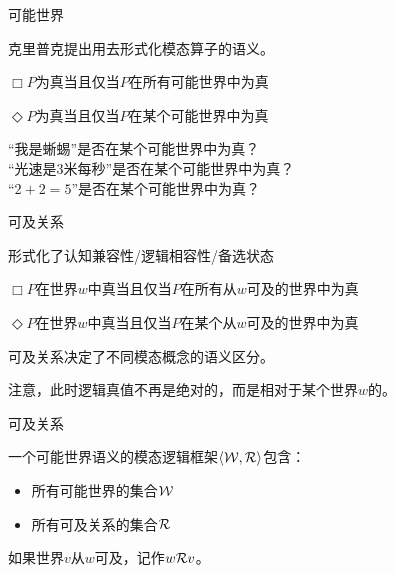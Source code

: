 \documentclass{zhslides}
\begin{document}
\begin{frame}{可能世界}
  
  \bit
    \item 克里普克提出用去形式化模态算子的语义。
    \item $\Box P$为真当且仅当$P$在所有可能世界中为真
    \item $\Diamond P$为真当且仅当$P$在某个可能世界中为真
  \eit
  \vspace{1.5em}
  \pause
  
  \begin{brainstorm*}{}
    “我是蜥蜴”是否在某个可能世界中为真？\\
    “光速是$3$米每秒”是否在某个可能世界中为真？\\
    “$2+2=5$”是否在某个可能世界中为真？
  \end{brainstorm*}
  \vspace{-1em}

\end{frame}


\begin{frame}{可及关系}
  
  形式化了认知兼容性/逻辑相容性/备选状态
  
  \bit
    \item $\Box P$在世界$w$中真当且仅当$P$在所有从$w$可及的世界中为真
    \item $\Diamond P$在世界$w$中真当且仅当$P$在某个从$w$可及的世界中为真
  \eit
  \pause
  
  可及关系决定了不同模态概念的语义区分。
  
  注意，此时逻辑真值不再是绝对的，而是相对于某个世界$w$的。
  
\end{frame}


\begin{frame}{可及关系}
  
  \begin{definition*}{}
    一个可能世界语义的模态逻辑框架$\oset{\struct{W}, \struct{R}}$包含：
    \begin{itemize}
      \item 所有可能世界的集合$\mathcal{W}$
      \item 所有可及关系的集合$\mathcal{R}$
    \end{itemize}
    如果世界$v$从$w$可及，记作$w\mathcal{R}v$。
  \end{definition*}
  
\end{frame}
\end{document}
